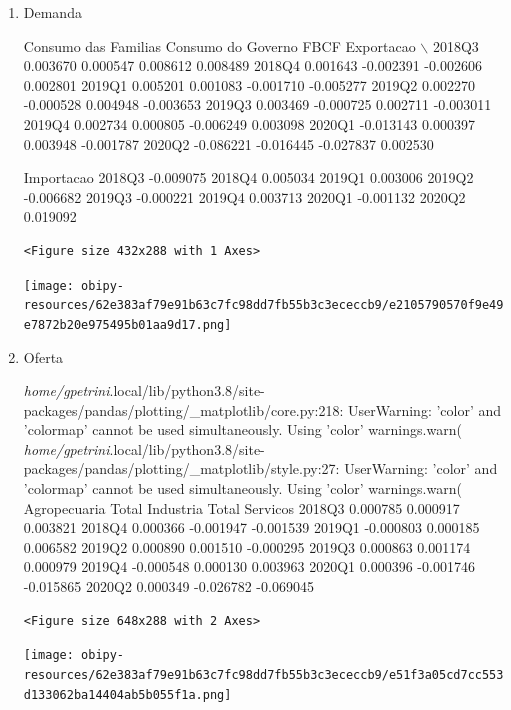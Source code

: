 \documentclass[11pt]{article}
\begin{document}
\begin{enumerate}
\item Demanda
\label{sec:org5f4ab67}

        Consumo das Familias  Consumo do Governo      FBCF  Exportacao  $\backslash$
2018Q3              0.003670            0.000547  0.008612    0.008489   
2018Q4              0.001643           -0.002391 -0.002606    0.002801   
2019Q1              0.005201            0.001083 -0.001710   -0.005277   
2019Q2              0.002270           -0.000528  0.004948   -0.003653   
2019Q3              0.003469           -0.000725  0.002711   -0.003011   
2019Q4              0.002734            0.000805 -0.006249    0.003098   
2020Q1             -0.013143            0.000397  0.003948   -0.001787   
2020Q2             -0.086221           -0.016445 -0.027837    0.002530   

        Importacao  
2018Q3   -0.009075  
2018Q4    0.005034  
2019Q1    0.003006  
2019Q2   -0.006682  
2019Q3   -0.000221  
2019Q4    0.003713  
2020Q1   -0.001132  
2020Q2    0.019092  

\begin{verbatim}
<Figure size 432x288 with 1 Axes>
\end{verbatim}


\begin{center}
\texttt{[image: obipy-resources/62e383af79e91b63c7fc98dd7fb55b3c3ececcb9/e2105790570f9e49e7872b20e975495b01aa9d17.png]}
\end{center}

\item Oferta
\label{sec:org215666d}

\emph{home/gpetrini}.local/lib/python3.8/site-packages/pandas/plotting/\_matplotlib/core.py:218: UserWarning: 'color' and 'colormap' cannot be used simultaneously. Using 'color'
  warnings.warn(
\emph{home/gpetrini}.local/lib/python3.8/site-packages/pandas/plotting/\_matplotlib/style.py:27: UserWarning: 'color' and 'colormap' cannot be used simultaneously. Using 'color'
  warnings.warn(
        Agropecuaria  Total Industria  Total Servicos
2018Q3      0.000785         0.000917        0.003821
2018Q4      0.000366        -0.001947       -0.001539
2019Q1     -0.000803         0.000185        0.006582
2019Q2      0.000890         0.001510       -0.000295
2019Q3      0.000863         0.001174        0.000979
2019Q4     -0.000548         0.000130        0.003963
2020Q1      0.000396        -0.001746       -0.015865
2020Q2      0.000349        -0.026782       -0.069045

\begin{verbatim}
<Figure size 648x288 with 2 Axes>
\end{verbatim}


\begin{center}
\texttt{[image: obipy-resources/62e383af79e91b63c7fc98dd7fb55b3c3ececcb9/e51f3a05cd7cc553d133062ba14404ab5b055f1a.png]}
\end{center}
\end{enumerate}
\end{document}
